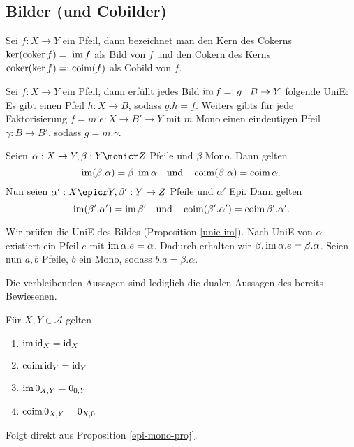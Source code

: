 \subsection{Bilder (und Cobilder)}

\begin{defn}
Sei $f : X\to Y$ ein Pfeil, dann bezeichnet man den Kern des Cokerns $\ker(\operatorname{coker} f) =: \operatorname{im} f$ als Bild von $f$
und den Cokern des Kerns $\operatorname{coker}(\ker f) =: \operatorname{coim}(f)$ als Cobild von $f$.
\end{defn}

\begin{prop}\label{unie-im}
Sei $f:X\to Y$ ein Pfeil, dann erfüllt jedes Bild $\operatorname{im} f =: g : B \to Y$ folgende UniE:
Es gibt einen Pfeil $h : X \to B$, sodass $g.h = f$. Weiters gibts für jede Faktorisierung $f = m . e : X \to B' \to Y$ mit $m$ Mono einen eindeutigen Pfeil $\gamma : B \to B'$, sodass $g = m.\gamma$.
\end{prop}

\begin{prop}\label{epi-mono-proj}
Seien $\alpha : X \to Y, \beta : Y \monicr Z$ Pfeile und $\beta$ Mono.
Dann gelten
\[ \operatorname{im}(\beta.\alpha) = \beta.\operatorname{im} \alpha
\quad\text{und}\quad
\operatorname{coim}(\beta.\alpha) = \operatorname{coim} \alpha.\]
Nun seien $\alpha' : X \epicr Y, \beta' : Y \to Z$ Pfeile und $\alpha'$ Epi.
Dann gelten
\[ \operatorname{im}(\beta'.\alpha') = \operatorname{im} \beta'
\quad\text{und}\quad
 \operatorname{coim}(\beta'.\alpha') = \operatorname{coim} \beta'.\alpha'.\]
\end{prop}
\begin{bew}
Wir prüfen die UniE des Bildes (Proposition \ref{unie-im}).
Nach UniE von $\alpha$ existiert ein Pfeil $e$ mit $\operatorname{im} \alpha.e = \alpha$.
Dadurch erhalten wir $\beta.\operatorname{im} \alpha.e = \beta.\alpha$.
Seien nun $a,b$ Pfeile, $b$ ein Mono, sodass $b.a = \beta . \alpha$.


Die verbleibenden Aussagen sind lediglich die dualen Aussagen des bereits Bewiesenen.
\end{bew}


\begin{korr}
Für $X,Y \in \mathcal A$ gelten
\begin{enumerate}
\item $\operatorname{im} \operatorname{id}_X = \operatorname{id}_X$
\item $\operatorname{coim} \operatorname{id}_Y = \operatorname{id}_Y$
\item $\operatorname{im} 0_{X,Y} = 0_{0,Y}$
\item $\operatorname{coim} 0_{X,Y} = 0_{X,0}$
\end{enumerate}
\end{korr}
\begin{bew}
Folgt direkt aus Proposition \ref{epi-mono-proj}.
\end{bew}

